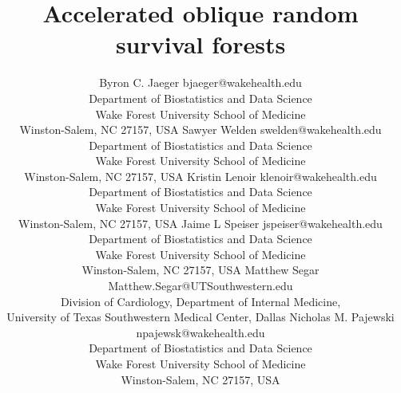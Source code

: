 \documentclass[twoside,11pt]{article}\usepackage[]{graphicx}\usepackage[]{xcolor}
\begin{document}
\title{Accelerated oblique random survival forests}

\author{\name Byron C. Jaeger \email bjaeger@wakehealth.edu \\
       \addr Department of Biostatistics and Data Science\\
       Wake Forest University School of Medicine\\
       Winston-Salem, NC 27157, USA
       \AND
       \name Sawyer Welden \email swelden@wakehealth.edu \\
       \addr Department of Biostatistics and Data Science\\
       Wake Forest University School of Medicine\\
       Winston-Salem, NC 27157, USA
       \AND
       \name Kristin Lenoir \email klenoir@wakehealth.edu \\
       \addr Department of Biostatistics and Data Science\\
       Wake Forest University School of Medicine\\
       Winston-Salem, NC 27157, USA
       \AND
       \name Jaime L Speiser \email jspeiser@wakehealth.edu \\
       \addr Department of Biostatistics and Data Science\\
       Wake Forest University School of Medicine\\
       Winston-Salem, NC 27157, USA
       \AND
       \name Matthew Segar \email Matthew.Segar@UTSouthwestern.edu \\
       \addr Division of Cardiology, Department of Internal Medicine, \\
       University of Texas Southwestern Medical Center, Dallas
       \AND
       \name Nicholas M. Pajewski \email npajewsk@wakehealth.edu \\
       \addr Department of Biostatistics and Data Science\\
       Wake Forest University School of Medicine\\
       Winston-Salem, NC 27157, USA}


\maketitle



\newpage
\end{document}
